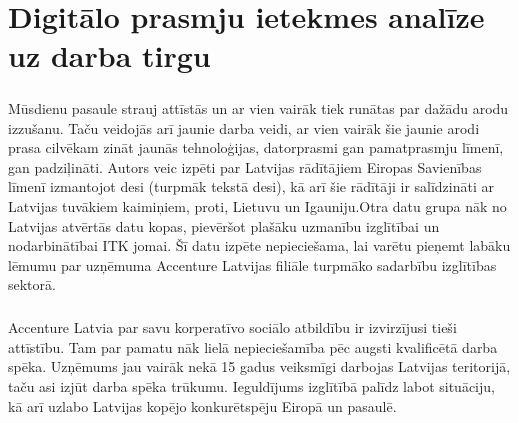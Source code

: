 \chapter{Digitālo prasmju ietekmes analīze uz darba tirgu}
\paragraph{}
Mūsdienu pasaule strauj attīstās un ar vien vairāk tiek runātas par dažādu arodu izzušanu.
Taču veidojās arī jaunie darba veidi, ar vien vairāk šie jaunie arodi prasa cilvēkam zināt
jaunās tehnoloģijas, datorprasmi gan pamatprasmju līmenī, gan padziļināti.
Autors veic izpēti par Latvijas rādītājiem Eiropas Savienības līmenī izmantojot \acrlong{desi} 
(turpmāk tekstā \acrshort{desi}), kā arī šie rādītāji ir salīdzināti ar Latvijas tuvākiem kaimiņiem,
proti, Lietuvu un Igauniju.Otra datu grupa nāk no Latvijas atvērtās datu kopas, pievēršot plašāku 
uzmanību izglītībai un nodarbinātībai ITK jomai. Šī datu izpēte nepieciešama, lai varētu pieņemt 
labāku lēmumu par uzņēmuma Accenture Latvijas filiāle turpmāko sadarbību izglītības sektorā.
\paragraph{}
Accenture Latvia par savu korperatīvo sociālo atbildību ir izvirzījusi tieši attīstību. Tam par pamatu nāk lielā nepieciešamība
pēc augsti kvalificētā darba spēka. Uzņēmums jau vairāk nekā 15 gadus veiksmīgi darbojas Latvijas teritorijā, taču asi izjūt
darba spēka trūkumu. Ieguldījums izglītībā palīdz labot situāciju, kā arī uzlabo Latvijas kopējo konkurētspēju Eiropā un pasaulē.

    
    
    
    
    

    
    

    
    


